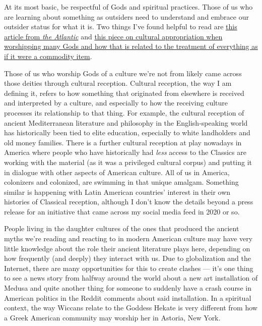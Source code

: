 \documentclass[
]{book}
\begin{document}
At its most basic, be respectful of Gods and spiritual practices. Those of us who are learning about something as outsiders need to understand and embrace our outsider status for what it is. Two things I've found helpful to read are \href{https://www.theatlantic.com/entertainment/archive/2015/10/the-dos-and-donts-of-cultural-appropriation/411292/}{this article from \emph{the Atlantic}} and \href{https://abeautifulresistance.org/site/2021/6/03/plague-of-gods}{this piece on cultural appropriation when worshipping many Gods and how that is related to the treatment of everything as if it were a commodity item}.

Those of us who worship Gods of a culture we're not from likely came across those deities through cultural reception. Cultural reception, the way I am defining it, refers to how something that originated from elsewhere is received and interpreted by a culture, and especially to how the receiving culture processes its relationship to that thing. For example, the cultural reception of ancient Mediterranean literature and philosophy in the English-speaking world has historically been tied to elite education, especially to white landholders and old money families. There is a further cultural reception at play nowadays in America where people who have historically had \emph{less} access to the Classics are working with the material (as it was a privileged cultural corpus) and putting it in dialogue with other aspects of American culture. All of us in America, colonizers and colonized, are swimming in that unique amalgam. Something similar is happening with Latin American countries' interest in their own histories of Classical reception, although I don't know the details beyond a press release for an initiative that came across my social media feed in 2020 or so.

People living in the daughter cultures of the ones that produced the ancient myths we're reading and reacting to in modern American culture may have very little knowledge about the role their ancient literature plays here, depending on how frequently (and deeply) they interact with us. Due to globalization and the Internet, there are many opportunities for this to create clashes --- it's one thing to see a news story from halfway around the world about a new art installation of Medusa and quite another thing for someone to suddenly have a crash course in American politics in the Reddit comments about said installation. In a spiritual context, the way Wiccans relate to the Goddess Hekate is very different from how a Greek American community may worship her in Astoria, New York.
\end{document}
